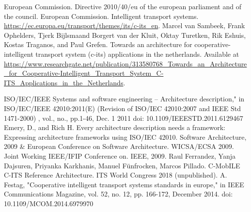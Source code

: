 \documentclass[conference]{IEEEtran}
\begin{document}
\begin{thebibliography}{00}

     European Commission. Directive 2010/40/eu of the european parliament and of the council.
     European Commission. Intelligent transport systems. \url{https://ec.europa.eu/transport/themes/its/c-its_en}.
     Marcel van Sambeek, Frank Ophelders, Tjerk Bijlsmaand Borgert van der Kluit, Oktay Turetken, Rik Eshuis, Kostas Traganos, and Paul Grefen. Towards an architecture for cooperative-intelligent transport system (c-its) applications in the netherlands. Available at \url{ https://www.researchgate.net/publication/313580768_Towards_an_Architecture_for_Cooperative-Intelligent_Transport_System_C-ITS_Applications_in_the_Netherlands}.

     ISO/IEC/IEEE Systems and software engineering -- Architecture description," in ISO/IEC/IEEE 42010:2011(E) (Revision of ISO/IEC 42010:2007 and IEEE Std 1471-2000) , vol., no., pp.1-46, Dec. 1 2011 doi: 10.1109/IEEESTD.2011.6129467
    Emery, D., and Rich H. Every architecture description needs a framework: Expressing architecture frameworks using ISO/IEC 42010. Software Architecture, 2009 \& European Conference on Software Architecture. WICSA/ECSA 2009. Joint Working IEEE/IFIP Conference on. IEEE, 2009.
    Raul Ferrandez, Yanja Dajsuren, Priyanka Karkhanis, Manuel Fünfrocken, Marcos Pillado. C-MobILE C-ITS Reference Architecture. ITS World Congress 2018 (unpublished).
    A. Festag, "Cooperative intelligent transport systems standards in europe," in IEEE Communications Magazine, vol. 52, no. 12, pp. 166-172, December 2014.  doi: 10.1109/MCOM.2014.6979970

\end{thebibliography}
\end{document}
